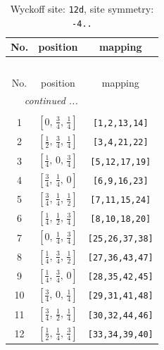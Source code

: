 \documentclass[fleqn,8pt]{jsarticle}
\begin{document}
\begin{longtable}{ccc}
\caption{Wyckoff site: {\tt 12d}, site symmetry: {\tt -4..}}
 \\
 \hline \hline
No. & position & mapping \\ \hline \endfirsthead

\multicolumn{2}{l}{\tablename\ \thetable{}} \\
 \hline \hline
No. & position & mapping \\ \hline \endhead

 \hline \hline
\multicolumn{2}{r}{\footnotesize\it continued ...} \\ \endfoot

 \hline \hline
\multicolumn{2}{r}{} \\ \endlastfoot

1 & $\left[ 0,\, \frac{3}{4},\, \frac{1}{4} \right]$ & {\tt [1,2,13,14]} \\ \hline
2 & $\left[ \frac{1}{2},\, \frac{3}{4},\, \frac{1}{4} \right]$ & {\tt [3,4,21,22]} \\ \hline
3 & $\left[ \frac{1}{4},\, 0,\, \frac{3}{4} \right]$ & {\tt [5,12,17,19]} \\ \hline
4 & $\left[ \frac{3}{4},\, \frac{1}{4},\, 0 \right]$ & {\tt [6,9,16,23]} \\ \hline
5 & $\left[ \frac{3}{4},\, \frac{1}{4},\, \frac{1}{2} \right]$ & {\tt [7,11,15,24]} \\ \hline
6 & $\left[ \frac{1}{4},\, \frac{1}{2},\, \frac{3}{4} \right]$ & {\tt [8,10,18,20]} \\ \hline
7 & $\left[ 0,\, \frac{1}{4},\, \frac{3}{4} \right]$ & {\tt [25,26,37,38]} \\ \hline
8 & $\left[ \frac{1}{4},\, \frac{3}{4},\, \frac{1}{2} \right]$ & {\tt [27,36,43,47]} \\ \hline
9 & $\left[ \frac{1}{4},\, \frac{3}{4},\, 0 \right]$ & {\tt [28,35,42,45]} \\ \hline
10 & $\left[ \frac{3}{4},\, 0,\, \frac{1}{4} \right]$ & {\tt [29,31,41,48]} \\ \hline
11 & $\left[ \frac{3}{4},\, \frac{1}{2},\, \frac{1}{4} \right]$ & {\tt [30,32,44,46]} \\ \hline
12 & $\left[ \frac{1}{2},\, \frac{1}{4},\, \frac{3}{4} \right]$ & {\tt [33,34,39,40]} \\
\end{longtable}
\renewcommand{\arraystretch}{1.2}
\end{document}
